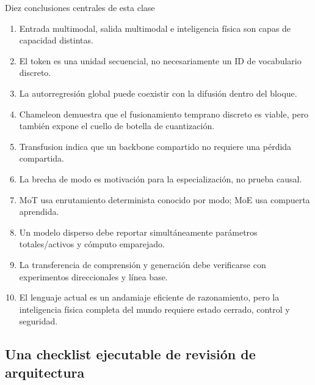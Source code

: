 
\begin{importantbox}{Diez conclusiones centrales de esta clase}
\begin{enumerate}
  \item Entrada multimodal, salida multimodal e inteligencia física son capas de capacidad distintas.
  \item El token es una unidad secuencial, no necesariamente un ID de vocabulario discreto.
  \item La autorregresión global puede coexistir con la difusión dentro del bloque.
  \item Chameleon demuestra que el fusionamiento temprano discreto es viable, pero también expone el cuello de botella de cuantización.
  \item Transfusion indica que un backbone compartido no requiere una pérdida compartida.
  \item La brecha de modo es motivación para la especialización, no prueba causal.
  \item MoT usa enrutamiento determinista conocido por modo; MoE usa compuerta aprendida.
  \item Un modelo disperso debe reportar simultáneamente parámetros totales/activos y cómputo emparejado.
  \item La transferencia de comprensión y generación debe verificarse con experimentos direccionales y línea base.
  \item El lenguaje actual es un andamiaje eficiente de razonamiento, pero la inteligencia física completa del mundo requiere estado cerrado, control y seguridad.
\end{enumerate}
\end{importantbox}

\subsection{Una checklist ejecutable de revisión de arquitectura}

